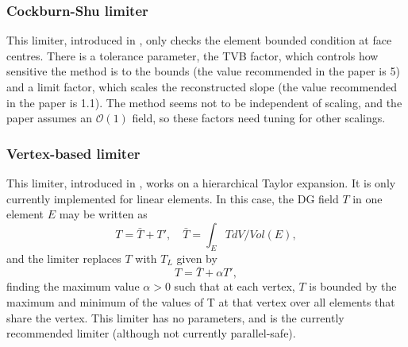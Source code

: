 \subsubsection{Cockburn-Shu limiter}
This limiter, introduced in \cite{cockburn2001}, only checks the element
bounded condition at face centres. There is a tolerance parameter, the
TVB factor, which controls how sensitive the method is to the bounds
(the value recommended in the paper is 5) and a limit factor, which
scales the reconstructed slope (the value recommended in the paper is
1.1). The method seems not to be independent of scaling, and the paper
assumes an $\mathcal{O}(1)$ field, so these factors need tuning for
other scalings.

\subsubsection{Vertex-based limiter}
This limiter, introduced in \cite{Ku2010}, works on a hierarchical
Taylor expansion. It is only currently implemented for linear elements.
In this case, the DG field $T$ in one element $E$ may be written as
\[
T = \bar{T} + T', \quad \bar{T} = \int_E T dV/Vol(E),
\]
and the limiter replaces $T$ with $T_L$ given by
\[
T = \bar{T} + \alpha T',
\]
finding the maximum value $\alpha>0$ such that at each vertex, $T$ is
bounded by the maximum and minimum of the values of T at that vertex
over all elements that share the vertex.  This limiter has no
parameters, and is the currently recommended limiter (although not
currently parallel-safe).

